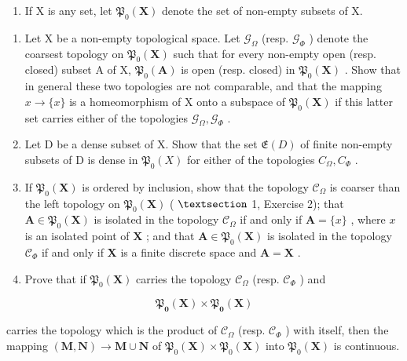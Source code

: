 \begin{enumerate}
\def\labelenumi{\arabic{enumi})}
\setcounter{enumi}{6}
\tightlist
\item
  If X is any set, let \(\mathfrak{P}_{0}(\mathbf{X})\) denote the set of non-empty subsets of X.
\end{enumerate}

\begin{enumerate}
\def\labelenumi{\alph{enumi})}
\item
  Let X be a non-empty topological space. Let \(\mathcal{G}_{\Omega}\) (resp. \(\mathcal{G}_{\Phi}\) ) denote the coarsest topology on \(\mathfrak{P}_{0}(\mathbf{X})\) such that for every non-empty open (resp. closed) subset A of X, \(\mathfrak{P}_{0}(\mathbf{A})\) is open (resp. closed) in \(\mathfrak{P}_{0}(\mathbf{X})\) . Show that in general these two topologies are not comparable, and that the mapping \(x \to \{x\}\) is a homeomorphism of X onto a subspace of \(\mathfrak{P}_{0}(\mathbf{X})\) if this latter set carries either of the topologies \(\mathcal{G}_{\Omega}, \mathcal{G}_{\Phi}\) .
\item
  Let D be a dense subset of X. Show that the set \(\mathfrak{E}(D)\) of finite non-empty subsets of D is dense in \(\mathfrak{P}_{0}(X)\) for either of the topologies \(C_{\Omega}, C_{\Phi}\) .
\item
  If \(\mathfrak{P}_{0}(\mathbf{X})\) is ordered by inclusion, show that the topology \(\mathcal{C}_{\Omega}\) is coarser than the left topology on \(\mathfrak{P}_{0}(\mathbf{X})\) ( \(\S\) 1, Exercise 2); that \(\mathbf{A} \in \mathfrak{P}_{0}(\mathbf{X})\) is isolated in the topology \(\mathcal{C}_{\Omega}\) if and only if \(\mathbf{A} = \{x\}\) , where \(x\) is an isolated point of \(\mathbf{X}\) ; and that \(\mathbf{A} \in \mathfrak{P}_{0}(\mathbf{X})\) is isolated in the topology \(\mathcal{C}_{\Phi}\) if and only if \(\mathbf{X}\) is a finite discrete space and \(\mathbf{A} = \mathbf{X}\) .
\item
  Prove that if \(\mathfrak{P}_0(\mathbf{X})\) carries the topology \(\mathcal{C}_{\Omega}\) (resp. \(\mathcal{C}_{\Phi}\) ) and
\end{enumerate}

\[
\mathfrak {P} _ {\mathbf {0}} (\mathbf {X}) \times \mathfrak {P} _ {\mathbf {0}} (\mathbf {X})
\]

carries the topology which is the product of \(\mathcal{C}_{\Omega}\) (resp. \(\mathcal{C}_{\Phi}\) ) with itself, then the mapping \((\mathbf{M}, \mathbf{N}) \to \mathbf{M} \cup \mathbf{N}\) of \(\mathfrak{P}_0(\mathbf{X}) \times \mathfrak{P}_0(\mathbf{X})\) into \(\mathfrak{P}_0(\mathbf{X})\) is continuous.

